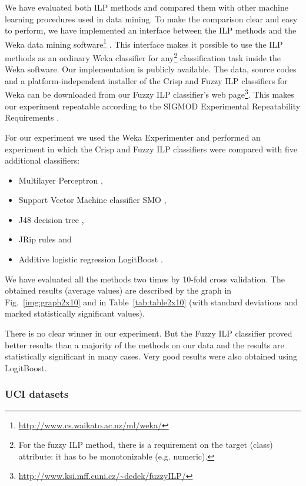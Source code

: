 We have evaluated both ILP methods and compared them with other machine learning procedures used in data mining. To make the comparison clear and easy to perform, we have implemented an interface between the ILP methods and the Weka data mining software\footnote{\url{http://www.cs.waikato.ac.nz/ml/weka/}} \citep{biblio:Weka}. This interface makes it possible to use the ILP methods as an ordinary Weka classifier for any\footnote{For the fuzzy ILP method, there is a requirement on the target (class) attribute: it has to be monotonizable (e.g. numeric).} classification task inside the Weka software. Our implementation is publicly available. The data, source codes and a platform-independent installer of the Crisp and Fuzzy ILP classifiers for Weka can be downloaded from our Fuzzy ILP classifier's web page\footnote{\url{http://www.ksi.mff.cuni.cz/~dedek/fuzzyILP/}}. This makes our experiment repeatable according to the
SIGMOD Experimental Repeatability Requirements \citep{biblio:SIGMODrepeatability}.


For our experiment we used the Weka Experimenter and performed an experiment in which the Crisp and Fuzzy ILP classifiers were compared with five additional classifiers:
\begin{itemize}
	\item Multilayer Perceptron \citep{biblio:bishop-1995},
	\item Support Vector Machine classifier SMO \citep{biblio:SMO},
	\item J48 decision tree \citep{biblio:J48},
	\item JRip rules \citep{weka:JRip} and
	\item Additive logistic regression LogitBoost \citep{biblio:LogitBoost}.
\end{itemize}
We have evaluated all the methods two times by 10-fold cross validation. %
The obtained results (average values) are described by the graph in Fig.~\ref{img:graph2x10} and in Table~\ref{tab:table2x10} (with standard deviations and marked statistically significant values).

There is no clear winner in our experiment. But the Fuzzy ILP classifier proved better results than a majority of the methods on our data and the results are statistically significant in many cases. Very good results were also obtained using LogitBoost. 


\subsubsection*{UCI datasets}



